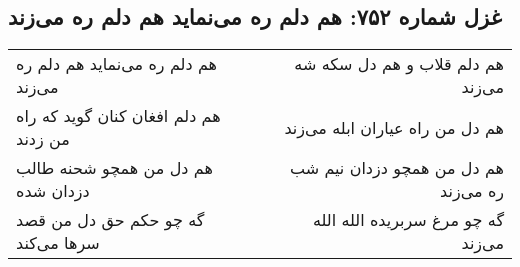 \begin{center}
\section*{غزل شماره ۷۵۲: هم دلم ره می‌نماید هم دلم ره می‌زند}
\label{sec:0752}
\begin{longtable}{l p{0.5cm} r}
هم دلم ره می‌نماید هم دلم ره می‌زند
&&
هم دلم قلاب و هم دل سکه شه می‌زند
\\
هم دلم افغان کنان گوید که راه من زدند
&&
هم دل من راه عیاران ابله می‌زند
\\
هم دل من همچو شحنه طالب دزدان شده
&&
هم دل من همچو دزدان نیم شب ره می‌زند
\\
گه چو حکم حق دل من قصد سرها می‌کند
&&
گه چو مرغ سربریده الله الله می‌زند
\\
\end{longtable}
\end{center}
